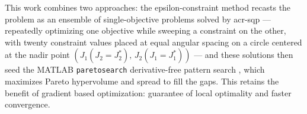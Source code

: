     This work combines two approaches: the epsilon-constraint method recasts the problem as an ensemble of single-objective problems solved by \gls{acr-sqp}
    --- repeatedly optimizing one objective while sweeping a constraint on the other,
    with twenty constraint values placed at equal angular spacing on a circle centered at the nadir point $(J_1(J_2=J_2^*),\, J_2(J_1=J_1^*))$
    --- and these solutions then seed the MATLAB \texttt{paretosearch} derivative-free pattern search \citep{custodio_direct_2011},
    which maximizes Pareto hypervolume and spread to fill the gaps.
    This retains the benefit of gradient based optimization: guarantee of local optimality and faster convergence.
\fi

